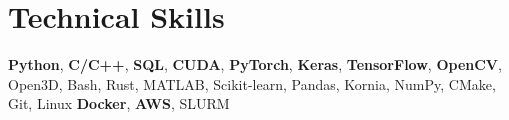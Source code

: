 \section{Technical Skills}
\small{
\textbf{Python},
\textbf{C/C++},
\textbf{SQL},
\textbf{CUDA},
\textbf{PyTorch},
\textbf{Keras},
\textbf{TensorFlow},
\textbf{OpenCV},
Open3D,
Bash,
Rust,
MATLAB,
Scikit-learn,
Pandas,
Kornia,
NumPy,
CMake,
Git,
Linux
\textbf{Docker},
\textbf{AWS},
SLURM
}
